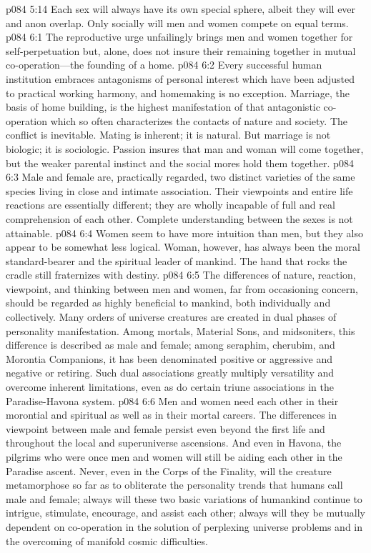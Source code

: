 \vs p084 5:14 Each sex will always have its own special sphere, albeit they will ever and anon overlap. Only socially will men and women compete on equal terms.
\vs p084 6:1 The reproductive urge unfailingly brings men and women together for self\hyp{}perpetuation but, alone, does not insure their remaining together in mutual co\hyp{}operation---the founding of a home.
\vs p084 6:2 Every successful human institution embraces antagonisms of personal interest which have been adjusted to practical working harmony, and homemaking is no exception. Marriage, the basis of home building, is the highest manifestation of that antagonistic co\hyp{}operation which so often characterizes the contacts of nature and society. The conflict is inevitable. Mating is inherent; it is natural. But marriage is not biologic; it is sociologic. Passion insures that man and woman will come together, but the weaker parental instinct and the social mores hold them together.
\pc \vs p084 6:3 Male and female are, practically regarded, two distinct varieties of the same species living in close and intimate association. Their viewpoints and entire life reactions are essentially different; they are wholly incapable of full and real comprehension of each other. Complete understanding between the sexes is not attainable.
\vs p084 6:4 Women seem to have more intuition than men, but they also appear to be somewhat less logical. Woman, however, has always been the moral standard\hyp{}bearer and the spiritual leader of mankind. The hand that rocks the cradle still fraternizes with destiny.
\pc \vs p084 6:5 The differences of nature, reaction, viewpoint, and thinking between men and women, far from occasioning concern, should be regarded as highly beneficial to mankind, both individually and collectively. Many orders of universe creatures are created in dual phases of personality manifestation. Among mortals, Material Sons, and midsoniters, this difference is described as male and female; among seraphim, cherubim, and Morontia Companions, it has been denominated positive or aggressive and negative or retiring. Such dual associations greatly multiply versatility and overcome inherent limitations, even as do certain triune associations in the Paradise\hyp{}Havona system.
\vs p084 6:6 Men and women need each other in their morontial and spiritual as well as in their mortal careers. The differences in viewpoint between male and female persist even beyond the first life and throughout the local and superuniverse ascensions. And even in Havona, the pilgrims who were once men and women will still be aiding each other in the Paradise ascent. Never, even in the Corps of the Finality, will the creature metamorphose so far as to obliterate the personality trends that humans call male and female; always will these two basic variations of humankind continue to intrigue, stimulate, encourage, and assist each other; always will they be mutually dependent on co\hyp{}operation in the solution of perplexing universe problems and in the overcoming of manifold cosmic difficulties.
